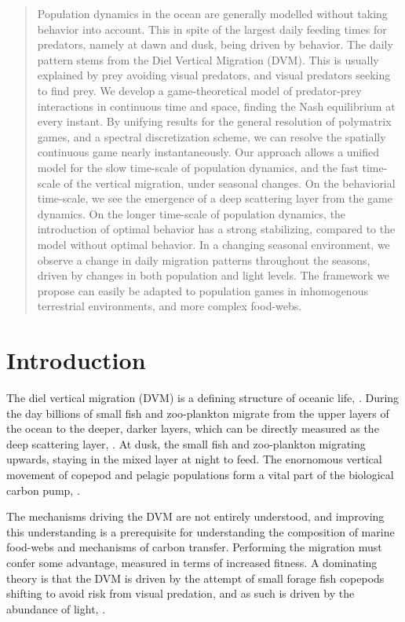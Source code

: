 \begin{abstract}

  Population dynamics in the ocean are generally modelled without taking behavior into account. This in spite of the largest daily feeding times for predators, namely at dawn and dusk, being driven by behavior. The daily pattern stems from the Diel Vertical Migration (DVM). This is usually explained by prey avoiding visual predators, and visual predators seeking to find prey. We develop a game-theoretical model of predator-prey interactions in continuous time and space, finding the Nash equilibrium at every instant. By unifying results for the general resolution of polymatrix games, and a spectral discretization scheme, we can resolve the spatially continuous game nearly instantaneously. Our approach allows a unified model for the slow time-scale of population dynamics, and the fast time-scale of the vertical migration, under seasonal changes.
  On the behaviorial time-scale, we see the emergence of a deep scattering layer from the game dynamics. On the longer time-scale of population dynamics, the introduction of optimal behavior has a strong stabilizing, compared to the model without optimal behavior. In a changing seasonal environment, we observe a change in daily migration patterns throughout the seasons, driven by changes in both population and light levels. The framework we propose can easily be adapted to population games in inhomogenous terrestrial environments, and more complex food-webs.
\end{abstract}
\section{Introduction}

The diel vertical migration (DVM) is a defining structure of oceanic life, \citep{olivar2017mesopelagic}. During the day billions of small fish and zoo-plankton migrate from the upper layers of the ocean to the deeper, darker layers, which can be directly measured as the deep scattering layer, \citep{sutton2013vertical, wang2014seasonal}. At dusk, the small fish and zoo-plankton migrating upwards, staying in the mixed layer at night to feed.
The enornomous vertical movement of copepod and pelagic populations form a vital part of the biological carbon pump, \citep{hansen2016carbon, ducklow2001upper}.

The mechanisms driving the DVM are not entirely understood, and improving this understanding is a prerequisite for understanding the composition of marine food-webs and mechanisms of carbon transfer. Performing the migration must confer some advantage, measured in terms of increased fitness. A dominating theory is that the DVM is driven by the attempt of small forage fish copepods shifting to avoid risk from visual predation, and as such is driven by the abundance of light, \citep{nilsson2003vertical}.

